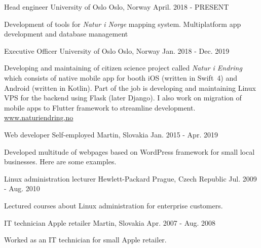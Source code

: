 
\begin{cventries}
  \cventry
    {Head engineer} %
    {University of Oslo} %
    {Oslo, Norway} %
    {April. 2018 - PRESENT} %
    {
      \begin{cvitems} %
        \item {Development of tools for \textit{Natur i Norge} mapping system. Multiplatform app development and database management}
      \end{cvitems}
    }
  \cventry
    {Executive Officer} %
    {University of Oslo} %
    {Oslo, Norway} %
    {Jan. 2018 - Dec. 2019} %
    {
      \begin{cvitems} %
        \item {Developing and maintaining of citizen science project called \textit{Natur i Endring} which consists of native mobile app for booth iOS (written in \mbox{Swift 4}) and Android (written in Kotlin). Part of the job is developing and maintaining Linux VPS for the backend using Flask (later Django). I also work on migration of mobile apps to Flutter framework to streamline development. \underline{\href{https://naturiendring.no}{www.naturiendring.no}}}
      \end{cvitems}
    }
    
    \cventry
    {Web developer} %
    {Self-employed} %
    {Martin, Slovakia} %
    {Jan. 2015 - Apr. 2019} %
    {
      \begin{cvitems} %
        \item {Developed multitude of webpages based on WordPress framework for small local businesses. Here are some examples.}
      \end{cvitems}
    }

  \cventry
    {Linux administration lecturer} %
    {Hewlett-Packard} %
    {Prague, Czech Republic} %
    {Jul. 2009 - Aug. 2010} %
    {
      \begin{cvitems} %
        \item {Lectured courses about Linux administration for enterprise customers.}
      \end{cvitems}
    }

  \cventry
    {IT technician} %
    {Apple retailer} %
    {Martin, Slovakia} %
    {Apr. 2007 - Aug. 2008} %
    {
      \begin{cvitems} %
        \item {Worked as an IT technician for small Apple retailer.}
      \end{cvitems}
    }

  
\end{cventries}

